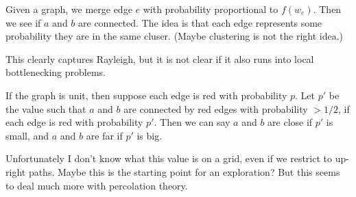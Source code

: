 Given a graph, we merge edge $e$ with probability proportional to
$f(w_e)$. Then we see if $a$ and $b$ are connected. The idea is
that each edge represents some probability they are in the same
cluser. (Maybe clustering is not the right idea.)

This clearly captures Rayleigh, but it is not clear if it also
runs into local bottlenecking problems.

If the graph is unit, then suppose each edge is red with
probability $p$. Let $p'$ be the value such that $a$ and $b$
are connected by red edges with probability $> 1/2$,
if each edge is red with probability $p'$. Then we can say $a$
and $b$ are close if $p'$ is small, and $a$ and $b$ are far if
$p'$ is big.

Unfortunately I don't know what this value is on a grid, even if
we restrict to up-right paths. Maybe this is the starting point
for an exploration? But this seems to deal much more with
percolation theory.
